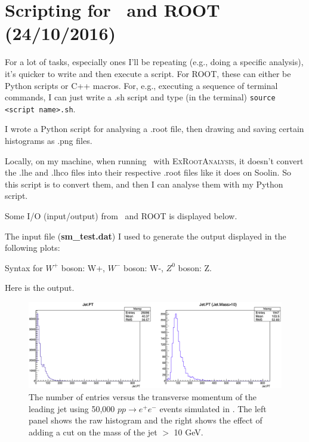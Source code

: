 \newpage
\section{Scripting for \madgraph\ and ROOT (24/10/2016)}

For a lot of tasks, especially ones I'll be repeating (e.g., doing a specific analysis), it's quicker to write and then execute a script. For ROOT, these can either be Python scripts or C++ macros. For, e.g., executing a sequence of terminal commands, I can just write a .sh script and type (in the terminal) \verb!source <script name>.sh!.

I wrote a Python script for analysing a .root file, then drawing and saving certain histograms as .png files.



Locally, on my machine, when running \madgraph\ with \textsc{ExRootAnalysis}, it doesn't convert the .lhe and .lhco files into their respective .root files like it does on Soolin. So this script is to convert them, and then I can analyse them with my Python script.



Some I/O (input/output) from \madgraph\ and ROOT is displayed below.

The input file (\textbf{sm\_test.dat}) I used to generate the output displayed in the following plots:



Syntax for $W^+$ boson: W+, $W^-$ boson: W-, $Z^0$ boson: Z.

Here is the output.

\begin{figure}[H]
\centering
\includegraphics[width=\textwidth]{./sec10/JetPT.png}
\caption{The number of entries versus the transverse momentum of the leading jet using 50,000 $pp \rightarrow e^+ e^-$ events simulated in \madgraph. The left panel shows the raw histogram and the right shows the effect of adding a cut on the mass of the jet $>$ 10 GeV.}
\end{figure}

